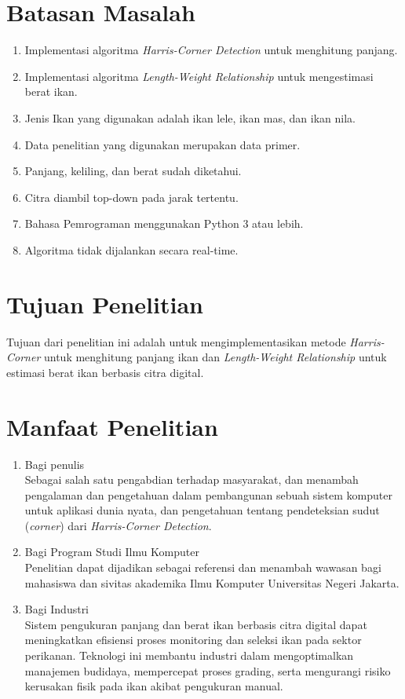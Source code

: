 \section{Batasan Masalah}
\begin{enumerate}
    \setlength{\parskip}{0pt}
	\item Implementasi algoritma \emph{Harris-Corner Detection} untuk menghitung panjang.
    \item Implementasi algoritma \emph{Length-Weight Relationship} untuk mengestimasi berat ikan. 
	\item Jenis Ikan yang digunakan adalah ikan lele, ikan mas, dan ikan nila.
	\item Data penelitian yang digunakan merupakan data primer.
	\item Panjang, keliling, dan berat sudah diketahui.
	\item Citra diambil top-down pada jarak tertentu. 
	\item Bahasa Pemrograman menggunakan Python 3 atau lebih. 
    \item Algoritma tidak dijalankan secara real-time.
\end{enumerate}
	
\section{Tujuan Penelitian}
Tujuan dari penelitian ini adalah untuk mengimplementasikan metode \emph{Harris-Corner} untuk menghitung panjang ikan dan \emph{Length-Weight Relationship} untuk estimasi berat ikan berbasis citra digital.

\section{Manfaat Penelitian}
\begin{enumerate}
    \setlength{\parskip}{0pt}
    \item Bagi penulis\\
    Sebagai salah satu pengabdian terhadap masyarakat, dan menambah pengalaman dan pengetahuan dalam pembangunan sebuah sistem komputer untuk aplikasi dunia nyata, dan pengetahuan tentang pendeteksian sudut (\emph{corner}) dari \emph{Harris-Corner Detection}.
    
    \item Bagi Program Studi Ilmu Komputer\\
    Penelitian dapat dijadikan sebagai referensi dan menambah wawasan bagi mahasiswa dan sivitas akademika Ilmu Komputer Universitas Negeri Jakarta.

    \item Bagi Industri\\
    Sistem pengukuran panjang dan berat ikan berbasis citra digital dapat meningkatkan efisiensi proses monitoring dan seleksi ikan pada sektor perikanan. Teknologi ini membantu industri dalam mengoptimalkan manajemen budidaya, mempercepat proses grading, serta mengurangi risiko kerusakan fisik pada ikan akibat pengukuran manual.
\end{enumerate}

